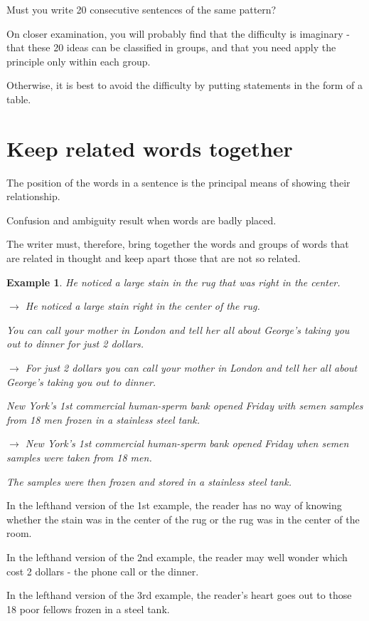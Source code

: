 \documentclass{book}
\numberwithin{equation}{section}
\newtheorem{example}{Example}[chapter]
\begin{document}
Must you write 20 consecutive sentences of the same pattern?

On closer examination, you will probably find that the difficulty is imaginary - that these 20 ideas can be classified in groups, and that you need apply the principle only within each group.

Otherwise, it is best to avoid the difficulty by putting statements in the form of a table.

\section{Keep related words together}
The position of the words in a sentence is the principal means of showing their relationship.

Confusion and ambiguity result when words are badly placed.

The writer must, therefore, bring together the words and groups of words that are related in thought and keep apart those that are not so related.
\begin{example}
    He noticed a large stain in the rug that was right in the center.
    
    $\to$ He noticed a large stain right in the center of the rug.
    
    You can call your mother in London and tell her all about George's taking you out to dinner for just 2 dollars.
    
    $\to$ For just 2 dollars you can call your mother in London and tell her all about George's taking you out to dinner.
    
    New York's 1st commercial human-sperm bank opened Friday with semen samples from 18 men frozen in a stainless steel tank.
    
    $\to$ New York's 1st commercial human-sperm bank opened Friday when semen samples were taken from 18 men.
    
    The samples were then frozen and stored in a stainless steel tank.
\end{example}
In the lefthand version of the 1st example, the reader has no way of knowing whether the stain was in the center of the rug or the rug was in the center of the room.

In the lefthand version of the 2nd example, the reader may well wonder which cost 2 dollars - the phone call or the dinner.

In the lefthand version of the 3rd example, the reader's heart goes out to those 18 poor fellows frozen in a steel tank.
\end{document}
